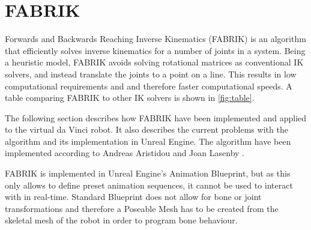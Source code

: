 \section{FABRIK}

Forwards and Backwards Reaching Inverse Kinematics (FABRIK) is an algorithm that efficiently solves inverse kinematics for a number of joints in a system. Being a heuristic model, FABRIK avoids solving rotational matrices as conventional IK solvers, and instead translate the joints to a point on a line. This results in low computational requirements and and therefore faster computational speeds. A table comparing FABRIK to other IK solvers is shown in \autoref{fig:table}. 

\begin{table}[H]
\centering
\label{fig:table}
\caption{Average results from different IK methods for a system with 10 joints}
\end{table}


The following section describes how FABRIK have been implemented and applied to the virtual da Vinci robot. It also describes the current problems with the algorithm and its implementation in Unreal Engine. 
The algorithm have been implemented according to Andreas Aristidou and Joan Lasenby \citep{FABRIK: A fast, iterative solver for the Inverse Kinematics problem}.  %

FABRIK is implemented in Unreal Engine's Animation Blueprint, but as this only allows to define preset animation sequences, it cannot be used to interact with in real-time. Standard Blueprint does not allow for bone or joint transformations and therefore a Poseable Mesh has to be created from the skeletal mesh of the robot in order to program bone behaviour. 

